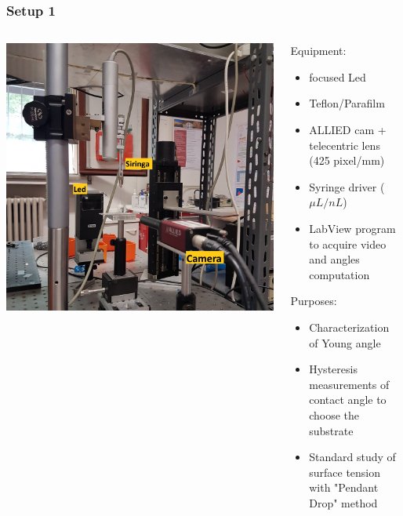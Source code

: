 \documentclass[xcolor=table]{beamer}
\begin{document}
\begin{frame}

\frametitle{Setup 1}
\fontsize{9}{10.2} \selectfont
\begin{columns}
	\begin{column}{.6\textwidth}
		\includegraphics[width=1.0\columnwidth]{20200708_152610.jpg}
	\end{column}
	\begin{column}{.4\textwidth}
		Equipment:
		\begin{itemize}
			\item focused Led 
			\item Teflon/Parafilm
			\item  ALLIED cam + telecentric lens (425 pixel/mm)
			\item Syringe driver ($\mu L / nL$)
			\item LabView program to acquire video and angles computation	\end{itemize}
		Purposes:
		\begin{itemize}
			\item Characterization of Young angle
			\item Hysteresis measurements of contact angle to choose the substrate
			\item Standard study of surface tension with "Pendant Drop" method
		\end{itemize}
		
	\end{column}
\end{columns}

\end{frame}
\end{document}
